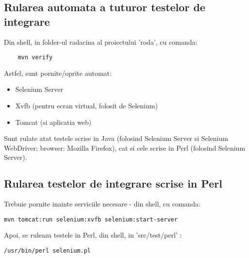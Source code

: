 \subsection{Rularea automata a tuturor testelor de integrare}
Din shell, in folder-ul radacina al proiectului 'roda', cu comanda:
\begin{lstlisting}
	mvn verify
\end{lstlisting}
Astfel, sunt pornite/oprite automat:
\begin{itemize}
\item
Selenium Server
\item
Xvfb (pentru ecran virtual, folosit de Selenium)
\item
Tomcat (si aplicatia web)
\end{itemize}

Sunt rulate atat testele scrise in Java 
(folosind Selenium Server si Selenium WebDriver; browser: Mozilla Firefox), 
cat si cele scrise in Perl (folosind Selenium Server).

\subsection{Rularea testelor de integrare scrise in Perl}
Trebuie pornite inainte serviciile necesare - din shell, cu comanda:
\begin{lstlisting}[breaklines=true]
	mvn tomcat:run selenium:xvfb selenium:start-server
\end{lstlisting}
Apoi, se ruleaza testele in Perl, din shell, in 'src/test/perl' :
\begin{lstlisting}[breaklines=true]
	/usr/bin/perl selenium.pl
\end{lstlisting}


\begin{comment}
\subsection{Rularea automata a testelor web (Selenium)}
Din shell, in folder-ul radacina al proiectului 'roda', cu comanda:
\begin{lstlisting}
	mvn tomcat:run selenium:selenese
\end{lstlisting}
\end{comment}


